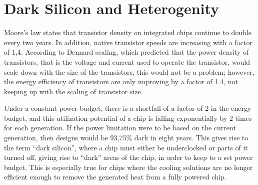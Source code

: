 %


\section{Dark Silicon and Heterogenity}
\label{sec:dark-silicon}

Moore's law states that transistor density on integrated chips continue to double every
two years. In addition, native transistor speeds are increasing with a factor of 1,4.
According to Dennard scaling, which predicted that the power density of transistors, that
is the voltage and current used to operate the transistor, would scale down with the
size of the transistors, this would not be a problem; however, the energy efficiency
of transistors are only improving by a factor of 1.4, not keeping up with the scaling
of transistor size.

Under a constant power-budget, there is a shortfall of a factor of 2 in the energy budget,
and this utilization potential of a chip is falling exponentially by 2 times for each generation.
If the power limitation were to be based on the current generation, then designs would be 93,75\% dark in eight years.
This gives rise to the term ``dark silicon'', where a chip must either be underclocked or parts of
it turned off, giving rise to ``dark'' areas of the chip, in order to keep to a set power budget.
This is especially true for chips where the cooling solutions are no longer efficient enough to remove
the generated heat from a fully powered chip.

